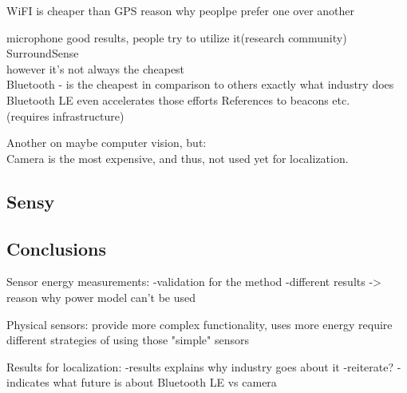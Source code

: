 WiFI is cheaper than GPS
	reason why peoplpe prefer one over another				
				
microphone good results, people try to utilize it(research community)\\
				SurroundSense \cite{azizyan:surroundsense}\\
				however it's not always the cheapest\\
	
Bluetooth - is the cheapest in comparison to others
				exactly what industry does\\
				Bluetooth LE even accelerates those efforts
				References to beacons etc.\\
				(requires infrastructure)
				
Another on maybe computer vision, but:				\\
	Camera is the most expensive, and thus, not used yet for localization.\\
	
			
								
\subsection{Sensy}
\subsection{Conclusions}
Sensor energy measurements:
	-validation for the method
	-different results -> reason why power model can't be used

Physical sensors:
	provide more complex functionality, uses more energy
		require different strategies of using those "simple" sensors

Results for localization: 
	-results explains why industry goes about it
		-reiterate?
		-indicates what future is about Bluetooth LE vs camera
